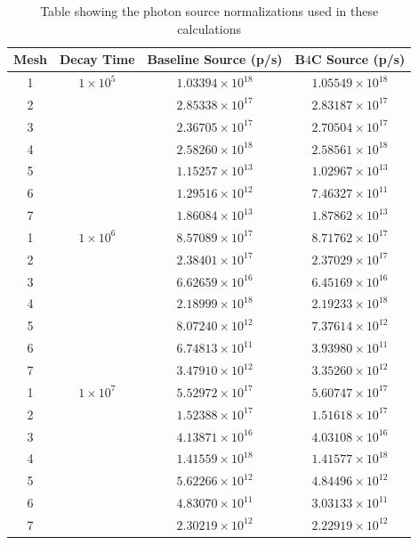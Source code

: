 \documentclass[12pt]{article}
\begin{document}
\begin{centering}
 \begin{table}[ht!]
 \centering
  \begin{tabular}{| c |  c |  c | c |}
  \hline
  Mesh & Decay Time & Baseline Source (p/s) & B$4$C Source (p/s) \\
  \hline
  1 & $1\times10^5$ & $1.03394\times10^{18}$ & $1.05549\times10^{18}$ \\ 
  2 &               & $2.85338\times10^{17}$ & $2.83187\times10^{17}$ \\   
  3 &               & $2.36705\times10^{17}$ & $2.70504\times10^{17}$ \\   
  4 &               & $2.58260\times10^{18}$ & $2.58561\times10^{18}$ \\   
  5 &               & $1.15257\times10^{13}$ & $1.02967\times10^{13}$ \\   
  6 &               & $1.29516\times10^{12}$ & $7.46327\times10^{11}$ \\ 
  7 &               & $1.86084\times10^{13}$ & $1.87862\times10^{13}$ \\   
  \hline 
  1 & $1\times10^6$ & $8.57089\times10^{17}$ & $8.71762\times10^{17}$ \\ 
  2 &               & $2.38401\times10^{17}$ & $2.37029\times10^{17}$ \\   
  3 &               & $6.62659\times10^{16}$ & $6.45169\times10^{16}$ \\   
  4 &               & $2.18999\times10^{18}$ & $2.19233\times10^{18}$ \\   
  5 &               & $8.07240\times10^{12}$ & $7.37614\times10^{12}$ \\   
  6 &               & $6.74813\times10^{11}$ & $3.93980\times10^{11}$ \\   
  7 &               & $3.47910\times10^{12}$ & $3.35260\times10^{12}$ \\   
  \hline 
  1 & $1\times10^7$ & $5.52972\times10^{17}$ & $5.60747\times10^{17}$ \\   
  2 &               & $1.52388\times10^{17}$ & $1.51618\times10^{17}$ \\  
  3 &               & $4.13871\times10^{16}$ & $4.03108\times10^{16}$ \\   
  4 &               & $1.41559\times10^{18}$ & $1.41577\times10^{18}$ \\   
  5 &               & $5.62266\times10^{12}$ & $4.84496\times10^{12}$ \\   
  6 &               & $4.83070\times10^{11}$ & $3.03133\times10^{11}$ \\ 
  7 &               & $2.30219\times10^{12}$ & $2.22919\times10^{12}$ \\   
  \hline
  \end{tabular}
\caption{Table showing the photon source normalizations used in these calculations}
\label{tab:source_norms}
\end{table}
\end{centering}
\end{document}
